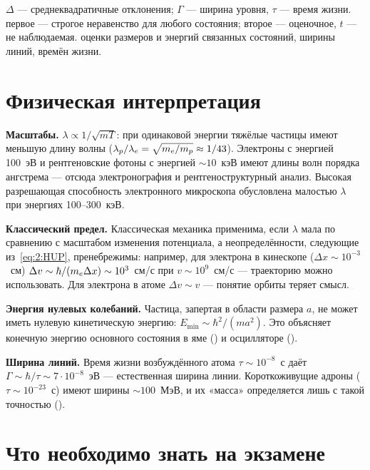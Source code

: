 {$\Delta$ — среднеквадратичные отклонения; $\Gamma$ — ширина уровня, $\tau$ — время жизни.}
 {первое — строгое неравенство для любого состояния; второе — оценочное, $t$ — не наблюдаемая.}
 {оценки размеров и энергий связанных состояний, ширины линий, времён жизни.}

\section{Физическая интерпретация}

\textbf{Масштабы.} $\lambda\propto1/\sqrt{mT}$: при одинаковой энергии тяжёлые частицы имеют
меньшую длину волны ($\lambda_p/\lambda_e=\sqrt{m_e/m_p}\approx1/43$). Электроны с энергией
100~эВ и рентгеновские фотоны с энергией $\sim10$~кэВ имеют длины волн порядка ангстрема —
отсюда электронография и рентгеноструктурный анализ. Высокая разрешающая способность электронного
микроскопа обусловлена малостью $\lambda$ при энергиях 100--300~кэВ.

\textbf{Классический предел.} Классическая механика применима, если $\lambda$ мала по сравнению
с масштабом изменения потенциала, а неопределённости, следующие из~\eqref{eq:2:HUP},
пренебрежимы: например, для электрона в кинескопе ($\Delta x\sim10^{-3}$~см) $\Delta v\sim\hbar/(m_e\Delta x)\sim10^3$~см/с
при $v\sim10^9$~см/с — траекторию можно использовать. Для электрона в атоме $\Delta v\sim v$ —
понятие орбиты теряет смысл.

\textbf{Энергия нулевых колебаний.} Частица, запертая в области размера $a$, не может иметь
нулевую кинетическую энергию: $E_{\min}\sim\hbar^2/(ma^2)$. Это объясняет конечную энергию
основного состояния в яме () и осцилляторе ().

\textbf{Ширина линий.} Время жизни возбуждённого атома $\tau\sim10^{-8}$~с даёт $\Gamma\sim\hbar/\tau\sim
7\cdot10^{-8}$~эВ — естественная ширина линии. Короткоживущие адроны ($\tau\sim10^{-23}$~с) имеют
ширины $\sim100$~МэВ, и их «масса» определяется лишь с такой точностью ().

\section{Что необходимо знать на экзамене}

